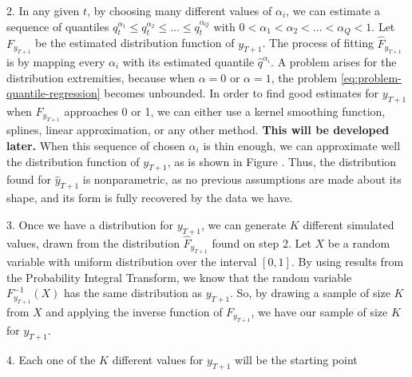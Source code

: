 2. In any given $t$, by choosing many different values of $\alpha_i$, we can estimate a sequence of quantiles $q^{\alpha_1}_{t} \leq q^{\alpha_2}_{t} \leq \dots \leq q^{\alpha_Q}_{t}$ with $0 < \alpha_1 < \alpha_2 < \dots < \alpha_Q < 1$. 
Let $F_{y_{T+1}}$ be the estimated distribution function of ${y}_{T+1}$. 
The process of fitting $\hat{F}_{y_{T+1}}$ is by mapping every $\alpha_i$ with its estimated quantile $\hat{q}^{\alpha_i}$. A problem arises for the distribution extremities, because when $\alpha = 0$ or $\alpha = 1$, the problem \ref{eq:problem-quantile-regression} becomes unbounded.
In order to find good estimates for $y_{T+1}$ when $F_{y_{T+1}}$ approaches 0 or 1, we can either use a kernel smoothing function, splines, linear approximation, or any other method. 
\textbf{This will be developed later.}
When this sequence of chosen $\alpha_i$ is thin enough, we can approximate well the distribution function of $y_{T+1}$, as is shown in Figure . %
Thus, the distribution found for $\hat{y}_{T+1}$ is nonparametric, as no previous assumptions are made about its shape, and its form is fully recovered by the data we have.

3. Once we have a distribution for $y_{T+1}$, we can generate $K$ different simulated values, drawn from the distribution $\hat{F}_{y_{T+1}}$ found on step 2. 
Let $X$ be a random variable with uniform distribution over the interval $[0,1]$. By using results from the Probability Integral Transform, we know that the random variable $F^{-1}_{y_{T+1}}(X)$ has the same distribution as $y_{T+1}$. So, by drawing a sample of size $K$ from $X$ and applying the inverse function of $F_{y_{T+1}}$, we have our sample of size $K$ for $y_{T+1}$.

4. Each one of the $K$ different values for $y_{T+1}$ will be the starting point 
